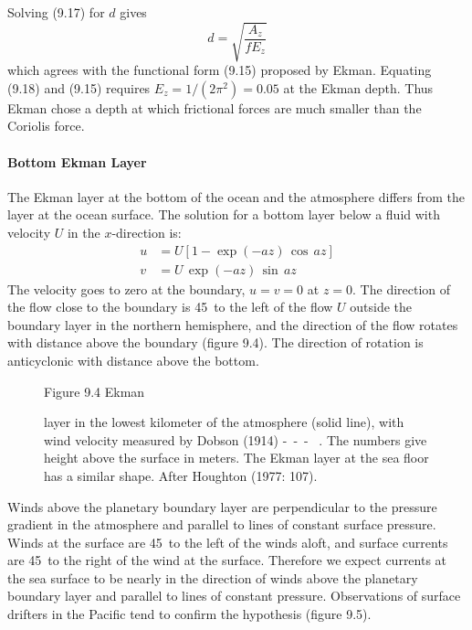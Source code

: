 Solving (9.17) for $d$ gives
\begin{equation}
d = \sqrt{\frac{A_z}{fE_z}}
\end{equation}
which agrees with the functional form (9.15) proposed by
Ekman. Equating (9.18) and (9.15) requires $E_z = 1/(2\pi^2) = 0.05$
at the Ekman depth. Thus Ekman chose a depth at which frictional
forces are much smaller than the Coriolis force.

\paragraph{Bottom Ekman Layer}
The Ekman layer at the bottom of the ocean
and the atmosphere differs from the layer at the ocean surface. The
solution for a bottom layer below a fluid with velocity $U$ in the
$x$-direction is:
\begin{subequations}
\begin{align}
u&=U[1 - \exp(-az)\,\cos\,az]  \\
v&=U\,\exp(-az)\,\sin\,az
\end{align}
\end{subequations}
The velocity goes to zero at the boundary, $u = v = 0$ at $z = 0$. The
direction of the flow close to the boundary is 45\degrees\ to the left
of the flow $U$ outside the boundary layer in the northern hemisphere,
and the direction of the flow rotates with distance above the boundary
(figure 9.4). The direction of rotation is anti\-cyclonic with
distance above the bottom.

\begin{figure}[b!]
\footnotesize
Figure 9.4 Ekman \rule{0mm}{3ex}layer in the lowest kilometer of the
atmosphere (solid line), with wind velocity measured by Dobson (1914)
-\ -\ - \ . The numbers give height above the surface in meters. The
Ekman layer at the sea floor has a similar shape. After Houghton
(1977: 107).
\label{fig:bottomekman}
\end{figure}

Winds above the planetary boundary layer are perpendicular to the
pressure gradient in the atmosphere and parallel to lines of constant
surface pressure.  Winds at the surface are 45\degrees\ to the left of
the winds aloft, and surface currents are 45\degrees\ to the right of
the wind at the surface. Therefore we expect currents at the sea
surface to be nearly in the direction of winds above the planetary
boundary layer and parallel to lines of constant
pressure. Observations of surface drifters
in the Pacific tend to confirm the hypothesis (figure 9.5).

